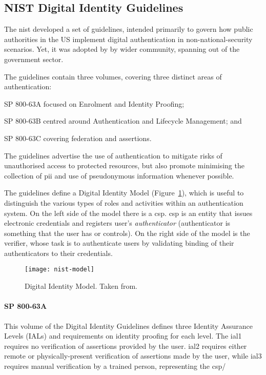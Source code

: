 \subsection{NIST Digital Identity Guidelines}

The \acrfull{nist} developed a set of guidelines, intended primarily to govern how public authorities in the US implement digital authentication in non-national-security scenarios. Yet, it was adopted by by wider community, spanning out of the government sector.

The guidelines contain three volumes, covering three distinct areas of authentication:
\begin{enumerate*}[label=(\roman*)]
    \item SP 800-63A focused on Enrolment and Identity Proofing;
    \item SP 800-63B centred around Authentication and Lifecycle Management; and
    \item SP 800-63C covering federation and assertions.
\end{enumerate*}
The guidelines advertise the use of authentication to mitigate risks of unauthorised access to protected resources, but also promote minimising the collection of \acrfull{pii} and use of pseudonymous information whenever possible.

The guidelines define a Digital Identity Model (Figure~\ref{fig:nist-model}), which is useful to distinguish the various types of roles and activities within an authentication system. On the left side of the model there is a \acrfull{csp}. \acrshort{csp} is an entity that issues electronic credentials and registers user's \textit{authenticator} (authenticator is something that the user has or controls). On the right side of the model is the verifier, whose task is to authenticate users by validating binding of their authenticators to their credentials.

 \begin{figure}[ht]
    \centering
    \texttt{[image: nist-model]}
    \caption{Digital Identity Model. Taken from.
    }
    \label{fig:nist-model}
\end{figure}

\paragraph{SP 800-63A}
This volume of the Digital Identity Guidelines defines three Identity Assurance Levels (IALs) and requirements on identity proofing for each level. The \acrshort{ial}1 requires no verification of assertions provided by the user. \acrshort{ial}2 requires either remote or physically-present verification of assertions made by the user, while \acrshort{ial}3 requires manual verification by a trained person, representing the \acrshort{csp}/

